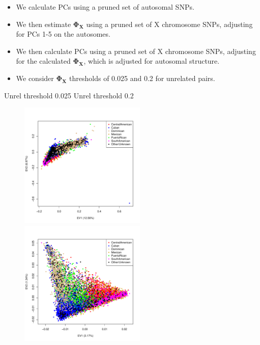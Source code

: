 \documentclass{beamer}
\begin{document}
\begin{frame}
\begin{itemize}
\item We calculate PCs using a pruned set of autosomal SNPs.
\item We then estimate $\mathbf{\Phi_X}$ using a pruned set of X chromosome SNPs, adjusting for PCs 1-5 on the autosomes.
\item We then calculate PCs using a pruned set of X chromosome SNPs, adjusting for the calculated $\mathbf{\Phi_X}$, which is adjusted for autosomal structure.
\item We consider $\mathbf{\Phi_X}$ thresholds of 0.025 and 0.2 for unrelated pairs.
\end{itemize}
\end{frame}

\begin{frame}
\footnotesize
Unrel threshold 0.025 \hspace{4cm} Unrel threshold 0.2
\centering
\begin{figure}
\includegraphics[height=6cm]{../pca_X_adjXkc_adjAutoXPC15_ev12_col.pdf}
\includegraphics[height=6cm]{../pca_prunedX_adjXkc_adjAutoPC15_xPrunedKC_ev12_col.pdf}
\end{figure}
\end{frame}
\end{document}
